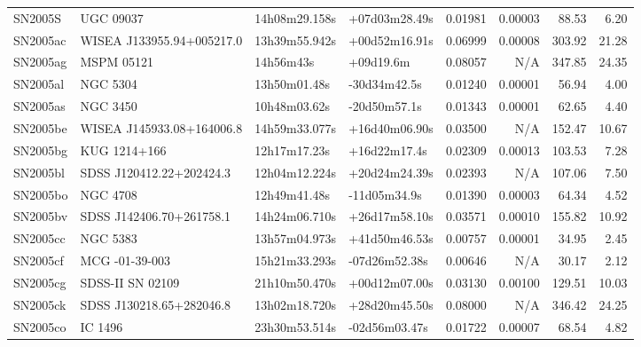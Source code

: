 \begin{longtable}{llllrrrr}
SN2005S          &                       UGC 09037 &   14h08m29.158s &   +07d03m28.49s &  0.01981 &  0.00003 &    88.53 &        6.20 \\
SN2005ac         &       WISEA J133955.94+005217.0 &   13h39m55.942s &   +00d52m16.91s &  0.06999 &  0.00008 &   303.92 &       21.28 \\
SN2005ag         &                      MSPM 05121 &       14h56m43s &       +09d19.6m &  0.08057 &      N/A &   347.85 &       24.35 \\
SN2005al         &                        NGC 5304 &    13h50m01.48s &    -30d34m42.5s &  0.01240 &  0.00001 &    56.94 &        4.00 \\
SN2005as         &                        NGC 3450 &    10h48m03.62s &    -20d50m57.1s &  0.01343 &  0.00001 &    62.65 &        4.40 \\
SN2005be         &       WISEA J145933.08+164006.8 &   14h59m33.077s &   +16d40m06.90s &  0.03500 &      N/A &   152.47 &       10.67 \\
SN2005bg         &                    KUG 1214+166 &    12h17m17.23s &    +16d22m17.4s &  0.02309 &  0.00013 &   103.53 &        7.28 \\
SN2005bl         &        SDSS J120412.22+202424.3 &   12h04m12.224s &   +20d24m24.39s &  0.02393 &      N/A &   107.06 &        7.50 \\
SN2005bo         &                        NGC 4708 &    12h49m41.48s &    -11d05m34.9s &  0.01390 &  0.00003 &    64.34 &        4.52 \\
SN2005bv         &        SDSS J142406.70+261758.1 &   14h24m06.710s &   +26d17m58.10s &  0.03571 &  0.00010 &   155.82 &       10.92 \\
SN2005cc         &                        NGC 5383 &   13h57m04.973s &   +41d50m46.53s &  0.00757 &  0.00001 &    34.95 &        2.45 \\
SN2005cf         &                  MCG -01-39-003 &   15h21m33.293s &   -07d26m52.38s &  0.00646 &      N/A &    30.17 &        2.12 \\
SN2005cg         &                SDSS-II SN 02109 &   21h10m50.470s &   +00d12m07.00s &  0.03130 &  0.00100 &   129.51 &       10.03 \\
SN2005ck         &        SDSS J130218.65+282046.8 &   13h02m18.720s &   +28d20m45.50s &  0.08000 &      N/A &   346.42 &       24.25 \\
SN2005co         &                         IC 1496 &   23h30m53.514s &   -02d56m03.47s &  0.01722 &  0.00007 &    68.54 &        4.82 \\

\end{longtable}
